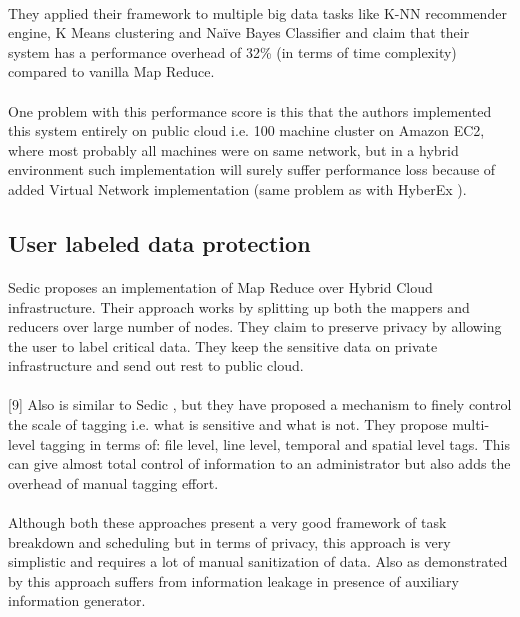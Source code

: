 \documentclass{report}
\begin{document}
\paragraph{}
They applied their framework to multiple big data tasks like K-NN recommender engine, K Means clustering and Naïve Bayes Classifier and claim that their system has a performance overhead of 32\% (in terms of time complexity) compared to vanilla Map Reduce.
\paragraph{}
One problem with this performance score is this that the authors implemented this system entirely on public cloud i.e. 100 machine cluster on Amazon EC2, where most probably all machines were on same network, but in a hybrid environment such implementation will surely suffer performance loss because of added Virtual Network implementation (same problem as with HyberEx \cite{ko2011hybrex}).
\subsection{User labeled data protection}
\paragraph{}
Sedic \cite{zhang2011sedic} proposes an implementation of Map Reduce over Hybrid Cloud infrastructure. Their approach works by splitting up both the mappers and reducers over large number of nodes. They claim to preserve privacy by allowing the user to label critical data. They keep the sensitive data on private infrastructure and send out rest to public cloud.
\paragraph{}
[9] Also is similar to Sedic \cite{zhang2011sedic}, but they have proposed a mechanism to finely control the scale of tagging i.e. what is sensitive and what is not. They propose multi-level tagging in terms of: file level, line level, temporal and spatial level tags. This can give almost total control of information to an administrator but also adds the overhead of manual tagging effort.
\paragraph{}
Although both these approaches present a very good framework of task breakdown and scheduling but in terms of privacy, this approach is very simplistic and requires a lot of manual sanitization of data. Also as demonstrated by \cite{dwork2004privacy} this approach suffers from information leakage in presence of auxiliary information generator.
\end{document}

